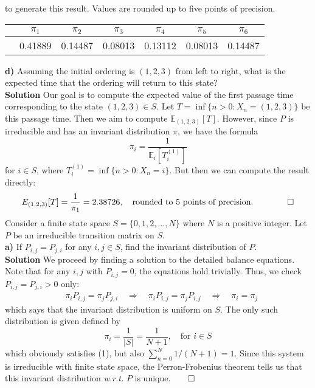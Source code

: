 \documentclass[11pt, letterpaper]{article}
\newcommand{\mbb}[1]{\mathbb{#1}}
\begin{document}
    to generate this result. Values are rounded up to five points of precision.
    \begin{center}
        \begin{tabular}{@{}lc|c|c|c|c|c@{}}\toprule
                & $\pi_1$ & $\pi_2$ & $\pi_3$ & $\pi_4$ & $\pi_5$ & $\pi_6$\\
                \midrule
                &0.41889 & 0.14487 & 0.08013 & 0.13112 & 0.08013 & 0.14487\\
            \bottomrule
        \end{tabular}
    \end{center}
    {\bf d)} Assuming the initial ordering is $(1,2,3)$ from left to right, what is the expected time that the ordering will return to this state?\\[10pt]
    {\bf Solution} Our goal is to compute the expected value of the first passage time corresponding to the state $(1,2,3)\in S$. Let $T=\inf\{n>0:X_n=(1,2,3)\}$ be this passage time. 
    Then we aim to compute $\mbb{E}_{(1,2,3)}[T]$. However, since $P$ is irreducible and has an invariant distribution $\pi$, we have the formula
    \[\pi_i=\frac{1}{\mbb{E}_i[T_i^{(1)}]}\]
    for $i\in S$, where $T_i^{(1)}=\inf\{n>0:X_n=i\}$. But then we can compute the result directly:
    \[E_{(1,2,3)}[T]=\frac{1}{\pi_1}=2.38726,\quad\text{rounded to 5 points of precision.\tag*{$\qed$}}\]
     Consider a finite state space $S=\{0,1,2,\dots, N\}$ where $N$ is a positive integer. Let $P$ be an irreducible transition matrix on $S$.\\[10pt]
    {\bf a)} If $P_{i,j}=P_{j,i}$ for any $i,j\in S$, find the invariant distribution of $P$.\\[10pt]
    {\bf Solution} We proceed by finding a solution to the detailed balance equations. Note that for any $i,j$ with $P_{i,j}=0$, the equations hold trivially. Thus, we check $P_{i,j}=P_{j,i}>0$ only:
    \begin{align*}
        &\pi_iP_{i,j}=\pi_j P_{j,i}\quad\Rightarrow\quad \pi_iP_{i,j}=\pi_j P_{i,j}\quad\Rightarrow\quad \pi_i=\pi_j\tag{1}
    \end{align*}
    which says that the invariant distribution is uniform on $S$. The only such distribution is given defined by
    \[\pi_i=\frac{1}{|S|}=\frac{1}{N+1},\quad\text{for $i\in S$}\]
    which obviously satisfies (1), but also $\sum_{n=0}^{N}1/(N+1)=1$. Since this system is irreducible with finite state space, the Perron-Fr\:obenius theorem tells us that this invariant distribution {\it w.r.t.} $P$ is unique.\hfill{$\qed$}\\[10pt]
\end{document}
